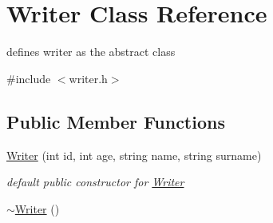 \hypertarget{classWriter}{\section{Writer Class Reference}
\label{classWriter}
}


defines writer as the abstract class  




{\ttfamily \#include $<$writer.\-h$>$}

\subsection*{Public Member Functions}
\begin{DoxyCompactItemize}
\item 
\hypertarget{classWriter_a4ddb26edf6a7f7020ef4aa10cd3cafc3}{\hyperlink{classWriter_a4ddb26edf6a7f7020ef4aa10cd3cafc3}{Writer} (int id, int age, string name, string surname)}\label{classWriter_a4ddb26edf6a7f7020ef4aa10cd3cafc3}

\begin{DoxyCompactList}\small\item\em default public constructor for \hyperlink{classWriter}{Writer} \end{DoxyCompactList}\item 
\hypertarget{classWriter_a6f57399b94731301d267ce10a2f52ea3}{\hyperlink{classWriter_a6f57399b94731301d267ce10a2f52ea3}{$\sim$\-Writer} ()}\label{classWriter_a6f57399b94731301d267ce10a2f52ea3}


\end{DoxyCompactItemize}
